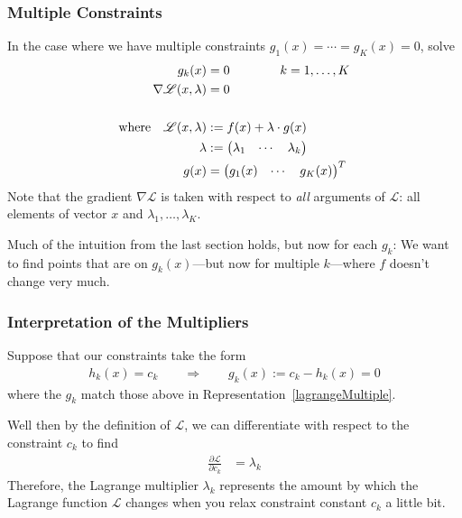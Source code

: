 \documentclass[a4paper,12pt]{scrartcl}
\theoremstyle{definition}
\theoremstyle{remark}
\begin{document}
\subsubsection{Multiple Constraints}

In the case where we have multiple constraints $g_1(x)=\cdots=g_K(x)=0$,
solve
\begin{align}
  g_k(x) &= 0 \qquad\qquad k=1,\ldots,K\label{lagrangeMultiple}\\
  \nabla \mathscr{L}(x,\lambda) &= 0 \notag\\\notag\\
  \text{where} \quad
  \mathscr{L}(x,\lambda)
  &:= f(x) + \lambda \cdot g(x) \notag\\
  \lambda &:=
  \begin{pmatrix}\lambda_1 & \cdots & \lambda_k\end{pmatrix} \notag\\
  g(x) &=
  \begin{pmatrix}g_1(x) & \cdots & g_K(x)\end{pmatrix}^T \notag
\end{align}
Note that the gradient $\nabla \mathscr{L}$ is taken with respect to
\emph{all} arguments of $\mathscr{L}$: all elements of vector $x$ and
$\lambda_1,\ldots,\lambda_K$.

Much of the intuition from the last section holds, but now for each
$g_k$: We want to find points that are on $g_k(x)$---but now for
multiple $k$---where $f$ doesn't change very much.

\subsubsection{Interpretation of the Multipliers}

Suppose that our constraints take the form
\begin{align*}
  h_k(x) = c_k
  \qquad \Rightarrow \qquad
  g_k(x) := c_k-h_k(x) = 0
\end{align*}
where the $g_k$ match those above in
Representation~\ref{lagrangeMultiple}.

Well then by the definition of $\mathscr{L}$, we can differentiate with respect to the constraint $c_k$ to find
\begin{align*}
  \frac{\partial\mathscr{L}}{\partial c_k}
  &= \lambda_k
\end{align*}
Therefore, the Lagrange multiplier $\lambda_k$ represents the amount by
which the Lagrange function $\mathscr{L}$ changes when you relax
constraint constant $c_k$ a little bit.
\end{document}

